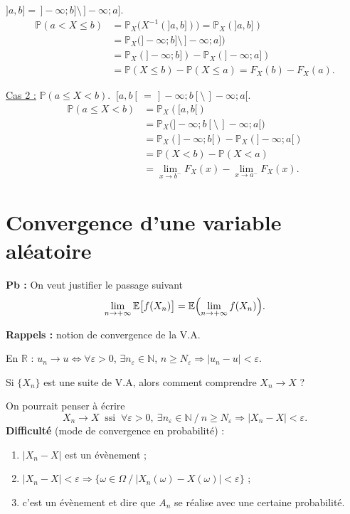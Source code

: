 \documentclass[11pt,a4paper]{article}
\newcommand{\R}{\mathbb{R}}
\newcommand{\N}{\mathbb{N}}
\newcommand{\PP}{\mathbb{P}}
\newcommand{\EE}{\mathbb{E}}
\begin{document}
\begin{center}
\end{center}

$]a,b]=\,]-\infty;b]\setminus\,]-\infty;a]$.
\begin{align*}
  \PP(a<X\le b)&=\PP_X\bigl(X^{-1}(]a,b])\bigr)=\PP_X(]a,b])\\
  &=\PP_X\bigl(]-\infty;b]\setminus\,]-\infty;a]\bigr)\\
  &=\PP_X(]-\infty;b])-\PP_X(]-\infty;a])\\
  &=\PP(X\le b)-\PP(X\le a)=F_X(b)-F_X(a).
\end{align*}

\underline{Cas 2 :} $\PP(a\le X<b)$. $\ [a,b[\,=\,]-\infty;b[\setminus\,]-\infty;a[$.
\begin{align*}
  \PP(a\le X<b)&=\PP_X([a,b[)\\
  &=\PP_X\bigl(]-\infty;b[\setminus\,]-\infty;a[\bigr)\\
  &=\PP_X(]-\infty;b[)-\PP_X(]-\infty;a[)\\
  &=\PP(X<b)-\PP(X<a)\\
  &=\lim_{x\to b^-}F_X(x)-\lim_{x\to a^-}F_X(x).
\end{align*}

\section*{Convergence d'une variable aléatoire}

\textbf{Pb :} On veut justifier le passage suivant
\[
  \lim_{n\to+\infty}\EE\bigl[f(X_n)\bigr]=\EE\Bigl(\lim_{n\to+\infty}f(X_n)\Bigr).
\]

\textbf{\color{bleu}Rappels :} notion de convergence de la V.A.

En $\R$ : $u_n\to u\iff\forall\varepsilon>0$, $\exists n_\varepsilon\in\N$, $n\ge N_\varepsilon\Rightarrow|u_n-u|<\varepsilon$.

Si $\{X_n\}$ est une suite de V.A, alors comment comprendre $X_n\to X$ ?

On pourrait penser à écrire
\[
  X_n\to X\ \text{ ssi }\ \forall\varepsilon>0,\ \exists n_\varepsilon\in\N\ /\ n\ge N_\varepsilon\Rightarrow|X_n-X|<\varepsilon .
\]
\textbf{Difficulté} (mode de convergence en probabilité) :
\begin{enumerate}[label=\textbf{\roman*)},leftmargin=1.2cm]
  \item $|X_n-X|$ est un évènement ;
  \item $|X_n-X|<\varepsilon\Rightarrow\{\omega\in\Omega\ /\ |X_n(\omega)-X(\omega)|<\varepsilon\}$ ;
  \item c'est un évènement et dire que $A_n$ se réalise avec une certaine probabilité.
\end{enumerate}
\end{document}
